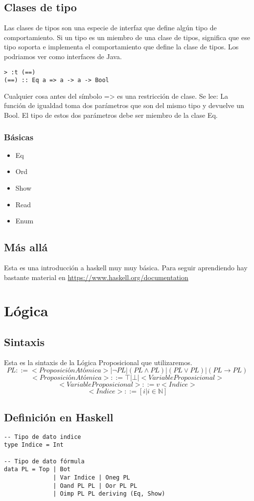 \documentclass[11pt]{article}
\begin{document}
\subsection{Clases de tipo}
\label{sec:orgc9aa777}
Las clases de tipos son una especie de interfaz que define algún tipo de
comportamiento. Si un tipo es un miembro de una clase de tipos, significa 
que ese tipo soporta e implementa el comportamiento que define la clase de tipos.
Los podriamos ver como interfaces de Java.
\begin{verbatim}
> :t (==)
(==) :: Eq a => a -> a -> Bool
\end{verbatim}
Cualquier cosa antes del símbolo => es una restricción de clase.
Se lee: La función de igualdad toma dos parámetros que son del mismo tipo
y devuelve un Bool. El tipo de estos dos parámetros debe ser miembro de la
clase Eq.
\subsubsection{Básicas}
\label{sec:org3e48978}
\begin{itemize}
\item Eq
\item Ord
\item Show
\item Read
\item Enum
\end{itemize}
\subsection{Más allá}
\label{sec:orga77021f}
Esta es una introducción a haskell muy muy básica.
Para seguir aprendiendo hay bastante material 
en \url{https://www.haskell.org/documentation}

\section{Lógica}
\label{sec:orge31d1ae}
\subsection{Sintaxis}
\label{sec:org554b6df}
Esta es la sintaxis de la Lógica Proposicional que utilizaremos. 
\[PL ::= <ProposiciónAtómica> | \neg PL | (PL \land PL) | (PL \lor PL) | (PL \to PL) \]
\[<ProposiciónAtómica> ::= \top | \bot | <VariableProposicional>\]
\[<VariableProposicional> ::= v<Indice>\]
\[ <Indice> ::= [i | i \in \mathbb{N}]\]

\subsection{Definición en Haskell}
\label{sec:org1db401f}
\begin{verbatim}
-- Tipo de dato indice
type Indice = Int

-- Tipo de dato fórmula
data PL = Top | Bot 
              | Var Indice | Oneg PL 
              | Oand PL PL | Oor PL PL 
              | Oimp PL PL deriving (Eq, Show)
\end{verbatim}
\end{document}
